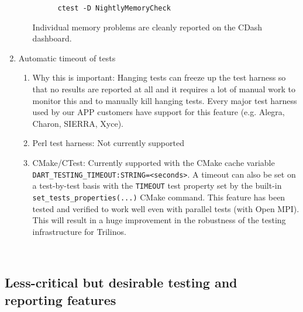 \documentclass[pdf,ps2pdf,11pt]{SANDreport}
\begin{document}
\begin{enumerate}
\begin{enumerate}
    \begin{verbatim}
      ctest -D NightlyMemoryCheck
    \end{verbatim}

  Individual memory problems are cleanly reported on the CDash
  dashboard.

  \end{enumerate}

{}\item Automatic timeout of tests

  \begin{enumerate}

  {}\item Why this is important: Hanging tests can freeze up the test
  harness so that no results are reported at all and it requires a lot
  of manual work to monitor this and to manually kill hanging tests.
  Every major test harness used by our APP customers have support for
  this feature (e.g. Alegra, Charon, SIERRA, Xyce).

  {}\item Perl test harness: Not currently supported

  {}\item CMake/CTest: Currently supported with the CMake cache
  variable {}\texttt{DART\_TESTING\_TIMEOUT:STRING=<seconds>}.  A
  timeout can also be set on a test-by-test basis with the
  {}\texttt{TIMEOUT} test property set by the built-in
  {}\texttt{set\_tests\_properties(...)} CMake command.  This feature
  has been tested and verified to work well even with parallel tests
  (with Open MPI).  This will result in a huge improvement in the
  robustness of the testing infrastructure for Trilinos.

  \end{enumerate}

\end{enumerate}

\
%
{}\subsection{Less-critical but desirable testing and reporting features}
%
\end{document}
